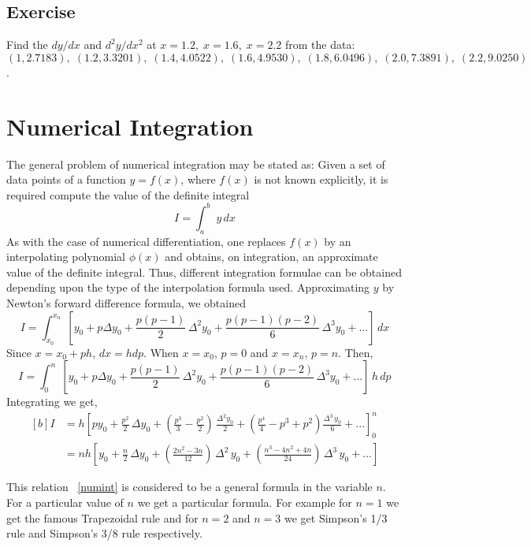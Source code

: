 \documentclass[aima203_lecturenotes_ku.tex]{subfiles}
\begin{document}
\subsection{Exercise}
Find the $dy/dx$ and $d^2y/dx^2$ at $x=1.2, \; x=1.6, \; x=2.2$ from the data: \\[1mm]
$(1, 2.7183), \; (1.2, 3.3201), \; (1.4, 4.0522), \; (1.6, 4.9530), \; (1.8, 6.0496), \; (2.0, 7.3891), \; (2.2, 9.0250)$.
\section{Numerical Integration}
The general problem of numerical integration may be stated as: Given a set of data points of a function $y=f(x)$, where $f(x)$ is not known explicitly, it is required compute the value of the definite integral $$I = \int_a^b \; y\,dx$$ As with the case of numerical differentiation, one replaces $f(x)$ by an interpolating polynomial $\phi(x)$ and obtains, on integration, an approximate value of the definite integral. Thus, different integration formulae can be obtained depending upon the type of the interpolation formula used. Approximating $y$ by Newton's forward difference formula, we obtained
$$ I = \int_{x_0}^{x_n} \; \left [ y_0 + p \Delta y_0 + \frac{p(p-1)}{2}\, \Delta^2 y_0 + \frac{p(p-1)(p-2)}{6}\, \Delta ^3 y_0 + ... \right ] \, dx$$
Since $x=x_0 +ph$, $dx = hdp$. When $x=x_0$, $p=0$ and $x=x_n$, $p=n$. Then,
$$ I = \int_{0}^{n} \; \left [ y_0 + p \Delta y_0 + \frac{p(p-1)}{2}\, \Delta^2 y_0 + \frac{p(p-1)(p-2)}{6}\, \Delta ^3 y_0 + ... \right ] \, h\,dp$$
Integrating we get,
\begin{equation}
  \label{numint}
  \begin{aligned}[b]
    I &= h \left [ py_0 + \frac{p^2}{2}\, \Delta y_0 + \left ( \frac{p^3}{3} - \frac{p^2}{2} \right ) \, \frac{\Delta^2 y_0}{2} +  \left ( \frac{p^4}{4} - p^3 + p^2 \right ) \frac{\Delta ^3 \, y_0}{6} + ... \right ]_0^n \\[1mm]
    &= nh \left [ y_0 + \frac{n}{2}\, \Delta y_0 + \left ( \frac{2n^2-3n}{12} \right ) \, \Delta^2\, y_0 +  \left ( \frac{n^3 - 4n^2 +4n}{24} \right ) \, \Delta ^3 \, y_0 + ... \right ]
  \end{aligned}
\end{equation}

This relation ~\ref{numint} is considered to be a general formula in the variable $n$. For a particular value of $n$ we get a particular formula. For example for $n=1$ we get the famous Trapezoidal rule and for $n=2$ and $n=3$ we get Simpson's 1/3 rule and Simpson's 3/8 rule respectively.
\end{document}
